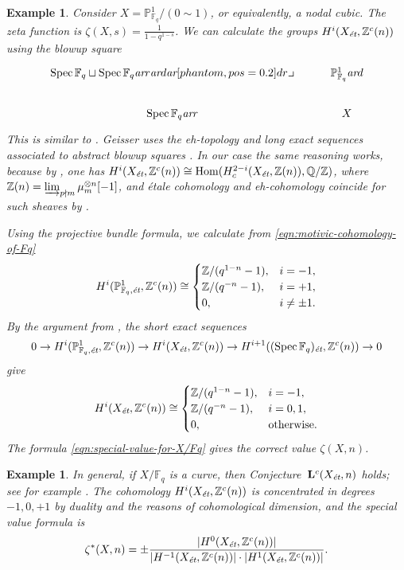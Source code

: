 \documentclass[10pt,a4paper,oneside]{article}
\DeclareMathOperator{\Hom}{Hom}
\DeclareMathOperator{\Spec}{Spec}
\newcommand{\FF}{\mathbb{F}}
\newcommand{\QQ}{\mathbb{Q}}
\newcommand{\ZZ}{\mathbb{Z}}
\newcommand{\PP}{\mathbb{P}}
\newcommand{\ar}{\text{\it ar}}
\newcommand{\et}{\text{\it \'{e}t}}
\newcommand{\tikzpb}{\ar[phantom,pos=0.2]{dr}{\text{\large$\lrcorner$}}}
\theoremstyle{myplain}
\theoremstyle{mydefinition}
\newtheorem{example}[theorem]{Example}
\numberwithin{equation}{section}
\begin{document}
\begin{example}
  Consider $X = \PP^1_{\FF_q}/(0\sim 1)$, or equivalently, a nodal cubic.
  The zeta function is $\zeta (X,s) = \frac{1}{1 - q^{1-s}}$.  We can calculate
  the groups $H^i (X_\et, \ZZ^c (n))$ using the blowup square
  \[ \begin{tikzcd}
      \Spec \FF_q \sqcup \Spec \FF_q \ar{r}\ar{d}\tikzpb & \PP^1_{\FF_q} \ar{d} \\
      \Spec \FF_q \ar{r} & X
    \end{tikzcd} \]
  This is similar to \cite[\S 8, Example~2]{Geisser-2006}. Geisser uses the
  eh-topology and long exact sequences associated to abstract blowup squares
  \cite[Proposition~3.2]{Geisser-2006}. In our case the same reasoning works,
  because by \cite[Theorem~I]{Beshenov-Weil-etale-1}, one has
  $H^i (X_\et, \ZZ^c (n)) \cong \Hom (H^{2-i}_c (X_\et, \ZZ (n)),\QQ/\ZZ)$,
  where $\ZZ (n) = \varinjlim_{p\nmid m} \mu_m^{\otimes n} [-1]$, and \'{e}tale
  cohomology and eh-cohomology coincide for such sheaves by
  \cite[Theorem~3.6]{Geisser-2006}.

  Using the projective bundle formula, we calculate from
  \eqref{eqn:motivic-cohomology-of-Fq}
  \[ H^i (\PP^1_{\FF_q,\et}, \ZZ^c (n)) \cong \begin{cases}
      \ZZ/(q^{1-n} - 1), & i = -1, \\
      \ZZ/(q^{-n} - 1), & i = +1, \\
      0, & i \ne \pm 1.
    \end{cases} \]
  By the argument from \cite[\S 8, Example~2]{Geisser-2006}, the short exact
  sequences
  \[ 0 \to H^i (\PP^1_{\FF_q,\et}, \ZZ^c (n)) \to
    H^i (X_\et, \ZZ^c (n)) \to
    H^{i+1} ((\Spec \FF_q)_\et, \ZZ^c (n)) \to 0 \]
  give
  \[ H^i (X_\et, \ZZ^c (n)) \cong \begin{cases}
      \ZZ/(q^{1-n} - 1), & i = -1, \\
      \ZZ/(q^{-n} - 1), & i = 0,1, \\
      0, & \text{otherwise}.
    \end{cases} \]
  The formula \eqref{eqn:special-value-for-X/Fq} gives the correct value
  $\zeta (X,n)$.
\end{example}

\begin{example}
  In general, if $X/\FF_q$ is a curve, then Conjecture~$\mathbf{L}^c (X_\et,n)$
  holds; see for example \cite[Proposition~4.3]{Geisser-2017}. The cohomology
  $H^i (X_\et, \ZZ^c(n))$ is concentrated in degrees $-1, 0, +1$ by duality
  \cite[Theorem~I]{Beshenov-Weil-etale-1} and the reasons of cohomological
  dimension, and the special value formula is
  \[ \zeta^* (X,n) =
    \pm \frac{|H^0 (X_\et, \ZZ^c (n))|}{|H^{-1} (X_\et, \ZZ^c (n))|\cdot |H^1 (X_\et, \ZZ^c (n))|}. \]
\end{example}
\end{document}
